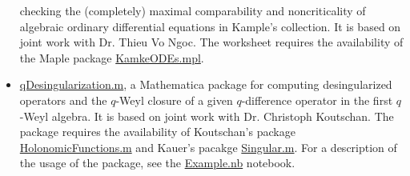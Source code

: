 \documentclass[a4paper,12pt]{article}
\begin{document}
\begin{CJK*}{UTF8}{gbsn}
\begin{itemize}
     checking the (completely) maximal comparability and noncriticality of algebraic
     ordinary differential equations in
     Kample's collection. It is based on joint work with Dr. Thieu Vo Ngoc. 
     The worksheet requires the availability of the Maple package \href{https://yzhang1616.github.io/KamkeODEs.mpl}{KamkeODEs.mpl}.
 \item \href{https://yzhang1616.github.io/qDesingularization.m}{qDesingularization.m}, a Mathematica
     package for computing desingularized operators and the $q$-Weyl closure of
     a given $q$-difference operator in
     the first $q$-Weyl algebra. It is based on joint work with Dr. Christoph
     Koutschan. The package requires the availability of Koutschan's package
     \href{http://www.risc.jku.at/research/combinat/software/ergosum/RISC/HolonomicFunctions.html}{HolonomicFunctions.m}
     and Kauer's pacakge \href{https://www.risc.jku.at/research/combinat/risc/software/Singular/index.html}{Singular.m}.
     For a description of the usage of the package, see the \href{https://yzhang1616.github.io/Example.nb}{Example.nb} notebook.
\end{itemize}


\end{CJK*}
\end{document}
